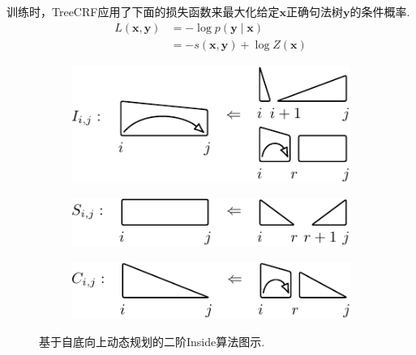 训练时，TreeCRF应用了下面的损失函数来最大化给定$\boldsymbol{x}$正确句法树$\boldsymbol{y}$的条件概率.
\begin{equation}\label{eq:training-loss-treecrf}
    \begin{split}
        \mathit{L}(\boldsymbol{x},\boldsymbol{y}) &= -\log p(\boldsymbol{y}\mid\boldsymbol{x})  \\
        &= - s(\boldsymbol{x}, \boldsymbol{y}) + \log Z(\boldsymbol{x})
    \end{split}
\end{equation}

\begin{figure}[tb]
    \centering
    \begin{subfigure}[b]{\textwidth}
        \begin{minipage}{\textwidth}
            \centering
            \includegraphics[scale=1.35]{figures/eisner-2o/a.pdf}
            \label{fig:eisner-2o-a}
        \end{minipage}
    \end{subfigure}
    \begin{subfigure}[b]{\textwidth}
        \begin{minipage}{\textwidth}
            \centering
            \includegraphics[scale=1.35]{figures/eisner-2o/b.pdf}
            \label{fig:eisner-2o-b}
        \end{minipage}
    \end{subfigure}
    \begin{subfigure}[b]{\textwidth}
        \begin{minipage}{\textwidth}
            \centering
            \includegraphics[scale=1.35]{figures/eisner-2o/c.pdf}
            \label{fig:eisner-2o-c}
        \end{minipage}
    \end{subfigure}
    \caption{基于自底向上动态规划的二阶Inside算法图示.}
    \label{fig:eisner-2o}
\end{figure}

